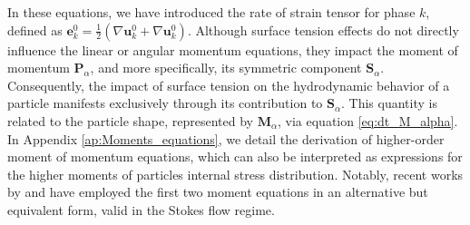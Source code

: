 In these equations, we have introduced the rate of strain tensor for phase \( k \), defined as \( \mathbf{e}_k^0 = \frac{1}{2} (\nabla \mathbf{u}_k^0 + \nabla \mathbf{u}_k^0) \). 
Although surface tension effects do not directly influence the linear or angular momentum equations, they impact the moment of momentum \( \mathbf{P}_\alpha \), and more specifically, its symmetric component \( \mathbf{S}_\alpha \).
Consequently, the impact of surface tension on the hydrodynamic behavior of a particle manifests exclusively through its contribution to \( \mathbf{S}_\alpha \). 
This quantity is related to the particle shape, represented by \( \mathbf{M}_\alpha \), via equation \ref{eq:dt_M_alpha}.
In Appendix \ref{ap:Moments_equations}, we detail the derivation of higher-order moment of momentum equations, which can also be interpreted as expressions for the higher moments of particles internal stress distribution. 
Notably, recent works by \citet{dolata2021faxen} and \citet{zhou2020lamb} have employed the first two moment equations in an alternative but equivalent form, valid in the Stokes flow regime.



